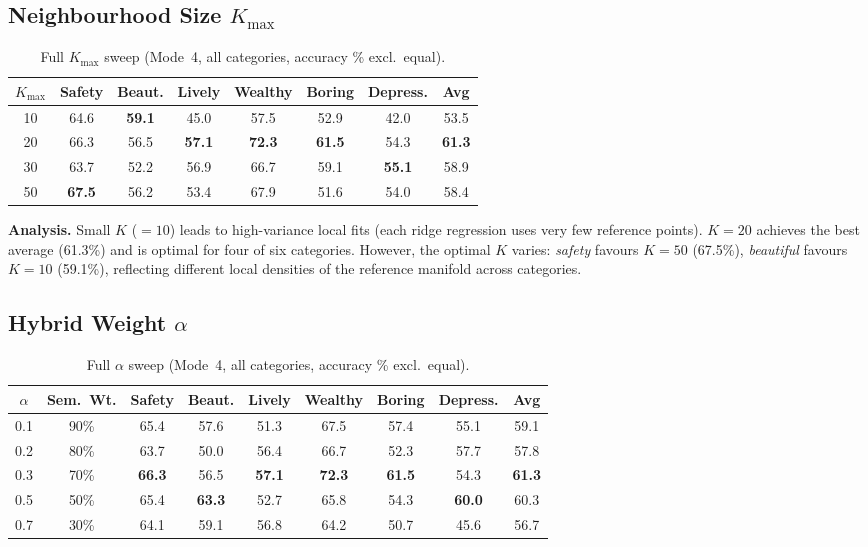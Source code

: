\documentclass[runningheads]{llncs}
\begin{document}
\subsection{Neighbourhood Size $K_{\max}$}

\begin{table}[ht]
\centering
\caption{Full $K_{\max}$ sweep (Mode~4, all categories, accuracy \% excl.\ equal).}
\label{tab:k_sweep}
\small
\setlength{\tabcolsep}{4pt}
\begin{tabular}{ccccccc|c}
\toprule
$K_{\max}$ & Safety & Beaut. & Lively & Wealthy & Boring & Depress. & Avg \\
\midrule
10 & 64.6 & \textbf{59.1} & 45.0 & 57.5 & 52.9 & 42.0 & 53.5 \\
20 & 66.3 & 56.5 & \textbf{57.1} & \textbf{72.3} & \textbf{61.5} & 54.3 & \textbf{61.3} \\
30 & 63.7 & 52.2 & 56.9 & 66.7 & 59.1 & \textbf{55.1} & 58.9 \\
50 & \textbf{67.5} & 56.2 & 53.4 & 67.9 & 51.6 & 54.0 & 58.4 \\
\bottomrule
\end{tabular}
\end{table}

\noindent\textbf{Analysis.}
Small $K$ ($=10$) leads to high-variance local fits (each ridge regression uses very few reference points).
$K{=}20$ achieves the best average (61.3\%) and is optimal for four of six categories.
However, the optimal $K$ varies: \emph{safety} favours $K{=}50$ (67.5\%), \emph{beautiful} favours $K{=}10$ (59.1\%), reflecting different local densities of the reference manifold across categories.

\subsection{Hybrid Weight $\alpha$}

\begin{table}[ht]
\centering
\caption{Full $\alpha$ sweep (Mode~4, all categories, accuracy \% excl.\ equal).}
\label{tab:alpha_sweep}
\small
\setlength{\tabcolsep}{4pt}
\begin{tabular}{cccccccc|c}
\toprule
$\alpha$ & Sem.\ Wt. & Safety & Beaut. & Lively & Wealthy & Boring & Depress. & Avg \\
\midrule
0.1 & 90\% & 65.4 & 57.6 & 51.3 & 67.5 & 57.4 & 55.1 & 59.1 \\
0.2 & 80\% & 63.7 & 50.0 & 56.4 & 66.7 & 52.3 & 57.7 & 57.8 \\
0.3 & 70\% & \textbf{66.3} & 56.5 & \textbf{57.1} & \textbf{72.3} & \textbf{61.5} & 54.3 & \textbf{61.3} \\
0.5 & 50\% & 65.4 & \textbf{63.3} & 52.7 & 65.8 & 54.3 & \textbf{60.0} & 60.3 \\
0.7 & 30\% & 64.1 & 59.1 & 56.8 & 64.2 & 50.7 & 45.6 & 56.7 \\
\bottomrule
\end{tabular}
\end{table}
\end{document}
